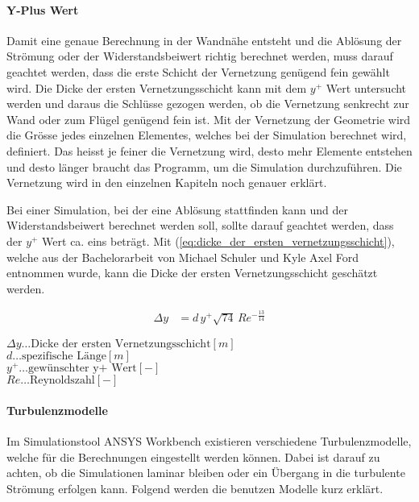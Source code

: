 \paragraph{Y-Plus Wert} 
\label{para:y_plus_wert}
$\;$\\
Damit eine genaue Berechnung in der Wandnähe entsteht und die Ablösung
der Strömung oder der Widerstandsbeiwert richtig berechnet werden,
muss darauf geachtet werden, dass die erste Schicht der Vernetzung
genügend fein gewählt wird. Die Dicke der ersten Vernetzungsschicht
kann mit dem $y^+$ Wert untersucht werden und daraus die Schlüsse
gezogen werden, ob die Vernetzung senkrecht zur Wand oder zum Flügel
genügend fein ist. Mit der Vernetzung der Geometrie wird die Grösse
jedes einzelnen Elementes, welches bei der Simulation berechnet wird,
definiert. Das heisst je feiner die Vernetzung wird, desto mehr
Elemente entstehen und desto länger braucht das Programm, um die Simulation durchzuführen. Die Vernetzung wird in den einzelnen Kapiteln noch genauer erklärt.

Bei einer Simulation, bei der eine Ablösung stattfinden kann und der Widerstandsbeiwert berechnet werden soll, sollte darauf geachtet werden, dass der $y^+$ Wert ca. eins beträgt. Mit (\ref{eq:dicke_der_ersten_vernetzungsschicht}), welche aus der Bachelorarbeit von Michael Schuler und Kyle Axel Ford \cite{ESA98} entnommen wurde, kann die Dicke der ersten Vernetzungsschicht geschätzt werden.

\begin{align}
\Delta y &= d \, y^+ \sqrt{74}\, Re^{-\frac{13}{14}}
\label{eq:dicke_der_ersten_vernetzungsschicht}
\end{align}
\begin{center}
\begin{minipage}{0.5\linewidth}
$\Delta y \dots \text{Dicke der ersten Vernetzungsschicht} \left[m\right]$\\
$d \dots \text{spezifische Länge} \left[m\right]$ \\
$y^+ \dots \text{gewünschter y+ Wert} \left[-\right]$\\
$Re \dots \text{Reynoldszahl} \left[-\right]$ \\
\end{minipage}
\end{center}


\paragraph{Turbulenzmodelle} 
\label{para:turbulenzmodelle}
$\;$\\
Im Simulationstool ANSYS Workbench existieren verschiedene Turbulenzmodelle, welche für die Berechnungen eingestellt werden können. Dabei ist darauf zu achten, ob die Simulationen laminar bleiben oder ein Übergang in die turbulente Strömung erfolgen kann. Folgend werden die benutzen Modelle kurz erklärt.

